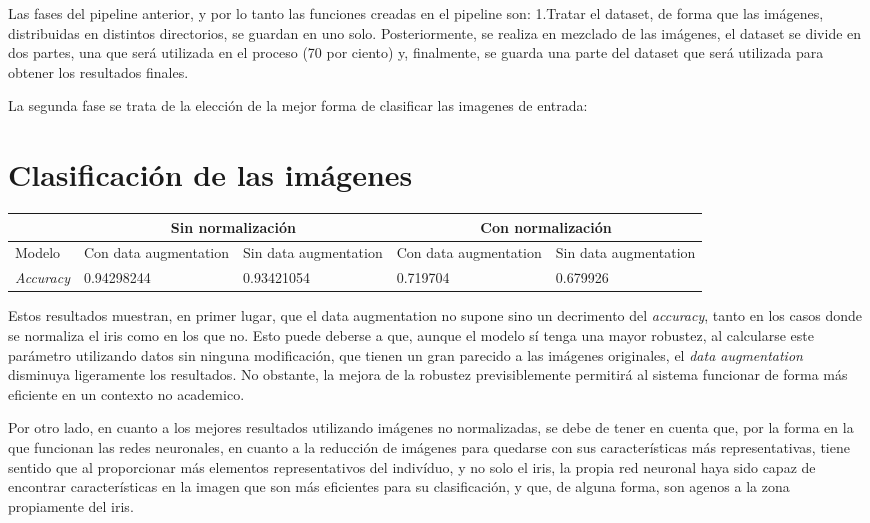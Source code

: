 Las fases del pipeline anterior, y por lo tanto las funciones creadas en el pipeline son:
1.Tratar el dataset, de forma que las imágenes, distribuidas en distintos directorios, se guardan en uno solo. Posteriormente, se realiza en mezclado de las imágenes, el dataset se divide en dos partes, 
una que será utilizada en el proceso (70 por ciento) y, finalmente, se guarda una parte del dataset que será utilizada para obtener los resultados finales.

La segunda fase se trata de la elección de la mejor forma de clasificar las imagenes de entrada:

\section{Clasificación de las imágenes}

\begin{tabular}{ |p{3cm}||p{3cm}|p{3cm}|p{3cm}|p{3cm}|  }
    \hline
     & \multicolumn{2}{|c|}{Sin normalización} & \multicolumn{2}{|c|}{Con normalización} \\
    \hline
    Modelo& Con data augmentation & Sin data augmentation &Con data augmentation&Sin data augmentation\\
    \hline
    \textit{Accuracy} & 0.94298244   & 0.93421054    & 0.719704 &   0.679926\\
    \hline
   \end{tabular}


Estos resultados muestran, en primer lugar, que el data augmentation no supone sino un decrimento del \textit{accuracy}, tanto en los casos donde se normaliza el iris
como en los que no. Esto puede deberse a que, aunque el modelo sí tenga una mayor robustez, al calcularse este parámetro utilizando datos sin ninguna modificación, que 
tienen un gran parecido a las imágenes originales, el \textit{data augmentation} disminuya ligeramente los resultados. No obstante, la mejora de la robustez previsiblemente
permitirá al sistema funcionar de forma más eficiente en un contexto no academico.

Por otro lado, en cuanto a los mejores resultados utilizando imágenes no normalizadas, se debe de tener en cuenta que, por la forma en la que funcionan las redes neuronales,
en cuanto a la reducción de imágenes para quedarse con sus características más representativas, tiene sentido que al proporcionar más elementos representativos del indivíduo,
y no solo el iris, la propia red neuronal haya sido capaz de encontrar características en la imagen que son más eficientes para su clasificación, y que, de alguna forma, son
agenos a la zona propiamente del iris.

